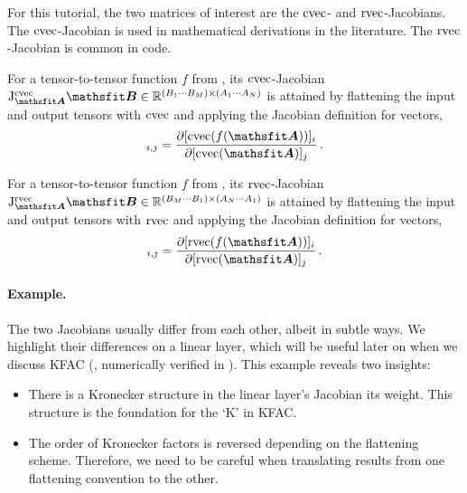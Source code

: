 \switchcolumn[1]
\switchcolumn[0]

For this tutorial, the two matrices of interest are the $\operatorname{cvec}$- and $\operatorname{rvec}$-Jacobians.
The $\operatorname{cvec}$-Jacobian is used in mathematical derivations in the literature.
The $\operatorname{rvec}$-Jacobian is common in code.

\begin{definition}\label{def:cvec_jacobian}
  For a tensor-to-tensor function $f$ from , its $\operatorname{cvec}$-Jacobian $\jac^{\cvec}_{\tA}\tB \in \sR^{(B_1 \cdots B_M) \times (A_1 \cdots A_N)}$ is attained by flattening the input and output tensors with $\operatorname{cvec}$ and applying the Jacobian definition for vectors,
  \begin{align*}
    [\jac^{\cvec}_{\tA}\tB]_{i,j}
    =
    \frac{\partial [\cvec(f(\tA))]_i}{\partial [\cvec(\tA)]_j}\,.
  \end{align*}
\end{definition}

\begin{definition}\label{def:rvec_jacobian}
  For a tensor-to-tensor function $f$ from , its $\operatorname{rvec}$-Jacobian $\jac^{\rvec}_{\tA}\tB \in \sR^{(B_M \cdots B_1) \times (A_N \cdots A_1)}$ is attained by flattening the input and output tensors with $\operatorname{rvec}$ and applying the Jacobian definition for vectors,
  \begin{align*}
    [\jac^{\rvec}_{\tA}\tB]_{i,j}
    =
    \frac{\partial [\rvec(f(\tA))]_i}{\partial [\rvec(\tA)]_j}\,.
  \end{align*}
\end{definition}

\paragraph{Example.} The two Jacobians usually differ from each other, albeit in subtle ways.
We highlight their differences on a linear layer, which will be useful later on when we discuss KFAC (, numerically verified in ).
This example reveals two insights:
\begin{itemize}
\item There is a Kronecker structure in the linear layer's Jacobian \wrt its weight.
  This structure is the foundation for the `K' in KFAC.

\item The order of Kronecker factors is reversed depending on the flattening scheme.
  Therefore, we need to be careful when translating results from one flattening convention to the other.
\end{itemize}

